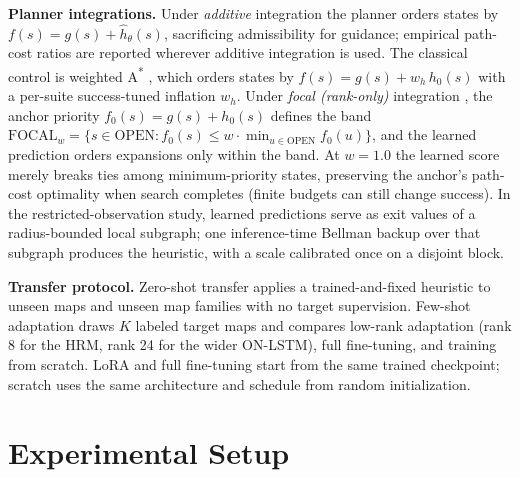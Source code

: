 \documentclass[letterpaper]{article} %
\begin{document}
\textbf{Planner integrations.} Under \emph{additive} integration the planner orders states by $f(s) = g(s) + \hat h_\theta(s)$, sacrificing admissibility for guidance; empirical path-cost ratios are reported wherever additive integration is used. The classical control is weighted A\textsuperscript{*} \citep{pohl1970}, which orders states by $f(s) = g(s) + w_h\, h_0(s)$ with a per-suite success-tuned inflation $w_h$. Under \emph{focal (rank-only)} integration \citep{pohl1970,pearl1982semiadmissible}, the anchor priority $f_0(s) = g(s) + h_0(s)$ defines the band $\mathrm{FOCAL}_w = \{ s \in \mathrm{OPEN} : f_0(s) \leq w \cdot \min_{u \in \mathrm{OPEN}} f_0(u) \}$, and the learned prediction orders expansions only within the band. At $w{=}1.0$ the learned score merely breaks ties among minimum-priority states, preserving the anchor's path-cost optimality when search completes (finite budgets can still change success). In the restricted-observation study, learned predictions serve as exit values of a radius-bounded local subgraph; one inference-time Bellman backup over that subgraph produces the heuristic, with a scale calibrated once on a disjoint block.

\textbf{Transfer protocol.} Zero-shot transfer applies a trained-and-fixed heuristic to unseen maps and unseen map families with no target supervision. Few-shot adaptation draws $K$ labeled target maps and compares low-rank adaptation \citep[LoRA;][]{hu2021lora} (rank 8 for the HRM, rank 24 for the wider ON-LSTM), full fine-tuning, and training from scratch. LoRA and full fine-tuning start from the same trained checkpoint; scratch uses the same architecture and schedule from random initialization.

\section{Experimental Setup}
\end{document}
